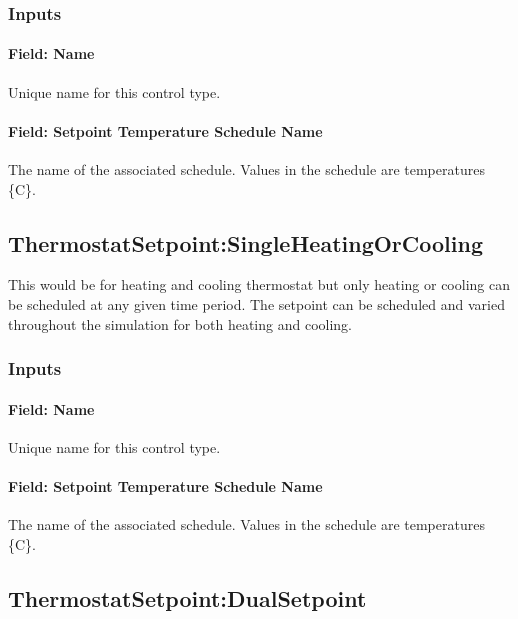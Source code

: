 \subsubsection{Inputs}\label{inputs-2-047}

\paragraph{Field: Name}\label{field-name-2-044}

Unique name for this control type.

\paragraph{Field: Setpoint Temperature Schedule Name}\label{field-setpoint-temperature-schedule-name-1-000}

The name of the associated schedule. Values in the schedule are temperatures \{C\}.

\subsection{ThermostatSetpoint:SingleHeatingOrCooling}\label{thermostatsetpointsingleheatingorcooling}

This would be for heating and cooling thermostat but only heating or cooling can be scheduled at any given time period. The setpoint can be scheduled and varied throughout the simulation for both heating and cooling.

\subsubsection{Inputs}\label{inputs-3-042}

\paragraph{Field: Name}\label{field-name-3-038}

Unique name for this control type.

\paragraph{Field: Setpoint Temperature Schedule Name}\label{field-setpoint-temperature-schedule-name-2}

The name of the associated schedule. Values in the schedule are temperatures \{C\}.

\subsection{ThermostatSetpoint:DualSetpoint}\label{thermostatsetpointdualsetpoint}

